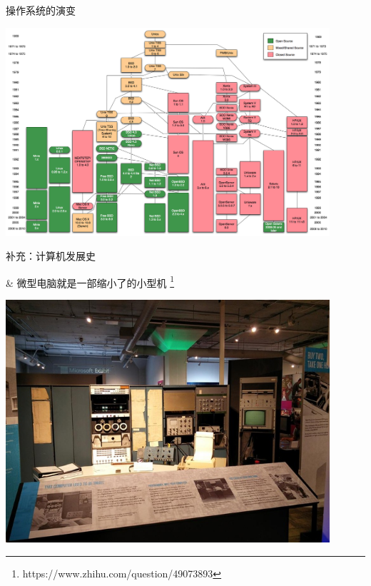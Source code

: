 \begin{frame}[fragile]{操作系统的演变}
\begin{center}
  \includegraphics[width=0.9\textwidth]{figure/intro-unix_history-simple.png}
\end{center}
\end{frame}


\begin{frame}[fragile]{补充：计算机发展史}
  \begin{easylist}
    & 微型电脑就是一部缩小了的小型机 \footnote{https://www.zhihu.com/question/49073893}
  \end{easylist}

  \includegraphics[width=0.9\textwidth]{figure/intro-minicomputer.jpg}
\end{frame}


